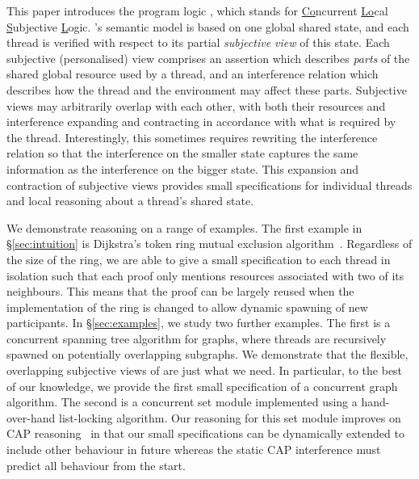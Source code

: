 This paper introduces the program logic \colosl, which stands for
\underline{Co}ncurrent \underline{Lo}cal \underline{S}ubjective
\underline{L}ogic. \colosl's semantic model is based on one global
shared state, and each thread is verified with respect to its partial
{\em subjective view} of this state.  Each subjective (personalised)
view comprises an assertion which describes \emph{parts} of the shared
global resource used by a thread, and an interference relation which
describes how the thread and the environment may affect these parts.
Subjective views may arbitrarily overlap with each other, with both
their resources and interference expanding and contracting in
accordance with what is required by the thread. Interestingly, this
sometimes requires rewriting the interference relation so that the
interference on the smaller state captures the same information as the
interference on the bigger state. This expansion and contraction of
subjective views provides small specifications for individual threads
and local reasoning about a thread's shared state.



We demonstrate \colosl reasoning on a range of examples.  The first
example in \S\ref{sec:intuition} is Dijkstra's token ring mutual
exclusion algorithm~\cite{dijkstra74}. Regardless of the size of the
ring, we are able to give a small specification to  each thread in
isolation such that each proof only mentions resources
associated with two of its neighbours. This means that the proof can be largely reused when the
implementation of the ring is changed to allow dynamic spawning of new
participants.  In \S\ref{sec:examples}, we study two further
examples. The first is a concurrent spanning tree algorithm for
graphs, where threads are recursively spawned on potentially
overlapping subgraphs. We demonstrate that the flexible, overlapping
subjective views of \colosl are just what we need. In particular, to
the best of our knowledge,
we provide the first small specification of a concurrent graph algorithm.
The second is a concurrent set module implemented 
using a hand-over-hand
list-locking algorithm. Our \colosl reasoning  for this set module  improves
on CAP reasoning~\cite{cap-ecoop10} in that our small
specifications can be dynamically extended to include other behaviour
in future
whereas the  static CAP interference  must predict all behaviour from the start. 



